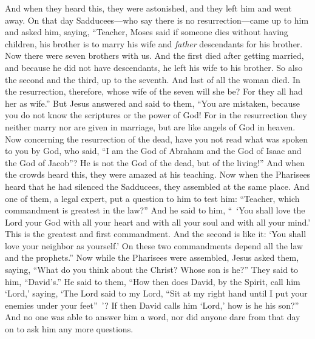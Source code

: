 \begin{biblechapter}
\verse And when they heard this, they were astonished, and they left him and went away.
 On that day Sadducees—who say there is no resurrection—came up to him and asked him,
\verse saying, “Teacher, Moses said if someone dies without having children, his brother is to marry his wife and \textit{father} descendants for his brother.
\verse Now there were seven brothers with us. And the first died after getting married, and because he did not have descendants, he left his wife to his brother.
\verse So also the second and the third, up to the seventh.
\verse And last of all the woman died.
\verse In the resurrection, therefore, whose wife of the seven will she be? For they all had her as wife.”
\verse But Jesus answered and said to them, “You are mistaken, because you do not know the scriptures or the power of God!
\verse For in the resurrection they neither marry nor are given in marriage, but are like angels of God in heaven.
\verse Now concerning the resurrection of the dead, have you not read what was spoken to you by God, who said,
\verse “I am the God of Abraham and the God of Isaac and the God of Jacob”? He is not the God of the dead, but of the living!”
\verse And when the crowds heard this, they were amazed at his teaching.
 Now when the Pharisees heard that he had silenced the Sadducees, they assembled at the same place.
\verse And one of them, a legal expert, put a question to him to test him:
\verse “Teacher, which commandment is greatest in the law?”
\verse And he said to him, “ ‘You shall love the Lord your God with all your heart and with all your soul and with all your mind.’
\verse This is the greatest and first commandment.
\verse And the second is like it: ‘You shall love your neighbor as yourself.’
\verse On these two commandments depend all the law and the prophets.”
 Now while the Pharisees were assembled, Jesus asked them,
\verse saying, “What do you think about the Christ? Whose son is he?” They said to him, “David’s.”
\verse He said to them, “How then does David, by the Spirit, call him ‘Lord,’ saying,
\verse ‘The Lord said to my Lord, 
“Sit at my right hand 
until I put your enemies 
under your feet” ’?
\verse If then David calls him ‘Lord,’ how is he his son?”
\verse And no one was able to answer him a word, nor did anyone dare from that day on to ask him any more questions.
\end{biblechapter}


